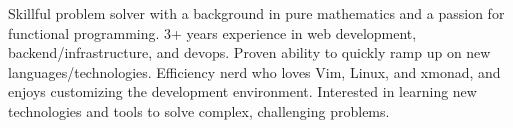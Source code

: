 

\begin{cvparagraph}

Skillful problem solver with a background in pure mathematics and a passion for
  functional programming.  3+ years experience in web development,
  backend/infrastructure, and devops.  Proven ability to quickly ramp up on new
  languages/technologies.  Efficiency nerd who loves Vim, Linux, and xmonad,
  and enjoys customizing the development environment.  Interested in learning
  new technologies and tools to solve complex, challenging problems.
\end{cvparagraph}
